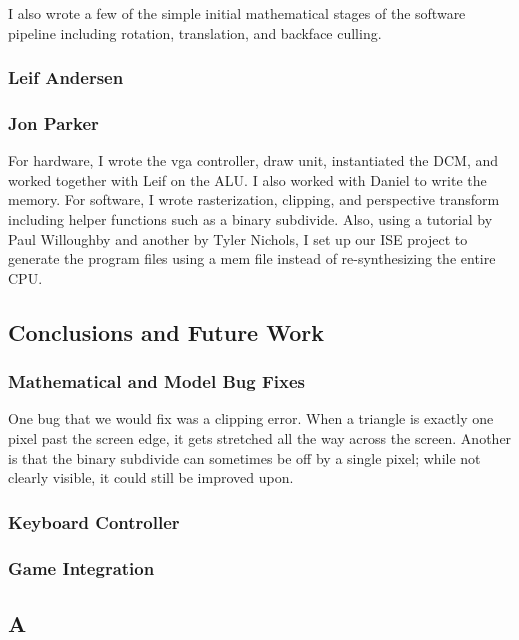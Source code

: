 \documentclass[onecolumn]{IEEEtran}
\begin{document}
I also wrote a few of the simple initial mathematical stages of the software pipeline including rotation, translation, and backface culling.

\subsection{Leif Andersen}

\subsection{Jon Parker}
For hardware, I wrote the vga controller, draw unit, instantiated the DCM, and worked together with Leif on the ALU.  I also worked with Daniel to write the memory.  For software, I wrote rasterization, clipping, and perspective transform including helper functions such as a binary subdivide.  Also, using a tutorial by Paul Willoughby and another by Tyler Nichols, I set up our ISE project to generate the program files using a mem file instead of re-synthesizing the entire CPU.


\section{Conclusions and Future Work}
\subsection{Mathematical and Model Bug Fixes}
One bug that we would fix was a clipping error. When a triangle is exactly one pixel past the screen edge, it gets stretched all the way across the screen.  Another is that the binary subdivide can sometimes be off by a single pixel; while not clearly visible, it could still be improved upon.

\subsection{Keyboard Controller}

\subsection{Game Integration}




\appendix
\begin{center}
\chapter{A}
\end{center}
\end{document}
